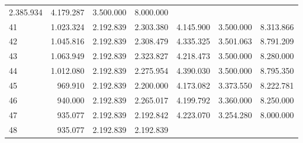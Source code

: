 \begin{tabular}{lllllll}
  \multicolumn{1}{r}{2.385.934} &
  \multicolumn{1}{r}{4.179.287} &
  \multicolumn{1}{r}{3.500.000} &
  \multicolumn{1}{r}{8.000.000} \\
\multicolumn{1}{l}{\hspace{1em}41} &
  \multicolumn{1}{|r}{1.023.324} &
  \multicolumn{1}{r}{2.192.839} &
  \multicolumn{1}{r}{2.303.380} &
  \multicolumn{1}{r}{4.145.900} &
  \multicolumn{1}{r}{3.500.000} &
  \multicolumn{1}{r}{8.313.866} \\
\multicolumn{1}{l}{\hspace{1em}42} &
  \multicolumn{1}{|r}{1.045.816} &
  \multicolumn{1}{r}{2.192.839} &
  \multicolumn{1}{r}{2.308.479} &
  \multicolumn{1}{r}{4.335.325} &
  \multicolumn{1}{r}{3.501.063} &
  \multicolumn{1}{r}{8.791.209} \\
\multicolumn{1}{l}{\hspace{1em}43} &
  \multicolumn{1}{|r}{1.063.949} &
  \multicolumn{1}{r}{2.192.839} &
  \multicolumn{1}{r}{2.323.827} &
  \multicolumn{1}{r}{4.218.473} &
  \multicolumn{1}{r}{3.500.000} &
  \multicolumn{1}{r}{8.280.000} \\
\multicolumn{1}{l}{\hspace{1em}44} &
  \multicolumn{1}{|r}{1.012.080} &
  \multicolumn{1}{r}{2.192.839} &
  \multicolumn{1}{r}{2.275.954} &
  \multicolumn{1}{r}{4.390.030} &
  \multicolumn{1}{r}{3.500.000} &
  \multicolumn{1}{r}{8.795.350} \\
\multicolumn{1}{l}{\hspace{1em}45} &
  \multicolumn{1}{|r}{969.910} &
  \multicolumn{1}{r}{2.192.839} &
  \multicolumn{1}{r}{2.200.000} &
  \multicolumn{1}{r}{4.173.082} &
  \multicolumn{1}{r}{3.373.550} &
  \multicolumn{1}{r}{8.222.781} \\
\multicolumn{1}{l}{\hspace{1em}46} &
  \multicolumn{1}{|r}{940.000} &
  \multicolumn{1}{r}{2.192.839} &
  \multicolumn{1}{r}{2.265.017} &
  \multicolumn{1}{r}{4.199.792} &
  \multicolumn{1}{r}{3.360.000} &
  \multicolumn{1}{r}{8.250.000} \\
\multicolumn{1}{l}{\hspace{1em}47} &
  \multicolumn{1}{|r}{935.077} &
  \multicolumn{1}{r}{2.192.839} &
  \multicolumn{1}{r}{2.192.842} &
  \multicolumn{1}{r}{4.223.070} &
  \multicolumn{1}{r}{3.254.280} &
  \multicolumn{1}{r}{8.000.000} \\
\multicolumn{1}{l}{\hspace{1em}48} &
  \multicolumn{1}{|r}{935.077} &
  \multicolumn{1}{r}{2.192.839} &
  \multicolumn{1}{r}{2.192.839} &

\end{tabular}
